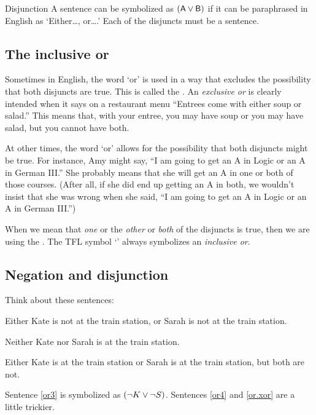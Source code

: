 \begin{factboxy}{Disjunction}
A sentence can be symbolized as $(\mathsf{A}\vee\mathsf{B})$ if it can be paraphrased in English as `Either\ldots, or\ldots.' Each of the disjuncts must be a sentence.
\end{factboxy}

\subsection{The inclusive or}\label{inclusive-or-1}

Sometimes in English, the word `or' is used in a way that excludes the possibility that both disjuncts are true. This is called the .  An \emph{exclusive or} is clearly intended when it says on a restaurant menu ``Entrees come with either soup or salad.'' This means that, with your entree, you may have soup or you may have salad, but you cannot have both.

At other times, the word `or' allows for the possibility that both disjuncts might be true. For instance, Amy might say, ``I am going to get an A in Logic or an A in German III.'' She probably means that she will get an A in one or both of those courses. (After all, if she did end up getting an A in both, we wouldn't insist that she was wrong when she said, ``I am going to get an A in Logic or an A in German III.'')

When we mean that \textit{one} or the \textit{other} or \textit{both} of the disjuncts is true, then we are using the . The TFL symbol `\eor' always symbolizes an \emph{inclusive or}.

\subsection{Negation and disjunction}

Think about these sentences:
	\begin{earg}
		\item[\ex{or3}] Either Kate is not at the train station, or Sarah is not at the train station.
		\item[\ex{or4}] Neither Kate nor Sarah is at the train station.
		\item[\ex{or.xor}] Either Kate is at the train station or Sarah is at the train station, but both are not.
	\end{earg}
Sentence \ref{or3} is symbolized as $({\neg} K \vee {\neg} S)$. Sentences \ref{or4} and \ref{or.xor} are a little trickier. 

